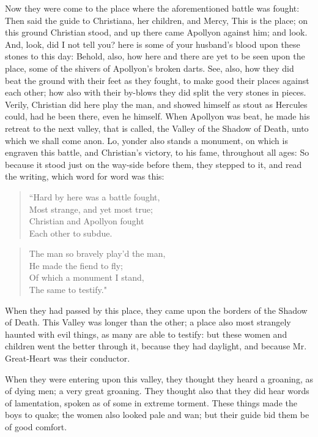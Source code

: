 Now they were come to the place where the aforementioned battle was fought: Then said the guide to Christiana, her children, and Mercy, This is the place; on this ground Christian stood, and up there came Apollyon against him; and look. And, look, did I not tell you? here is some of your husband's blood upon these stones to this day: Behold, also, how here and there are yet to be seen upon the place, some of the shivers of Apollyon's broken darts. See, also, how they did beat the ground with their feet as they fought, to make good their places against each other; how also with their by-blows they did split the very stones in pieces. Verily, Christian did here play the man, and showed himself as stout as Hercules could, had he been there, even he himself. When Apollyon was beat, he made his retreat to the next valley, that is called, the Valley of the Shadow of Death, unto which we shall come anon. Lo, yonder also stands a monument, on which is engraven this battle, and Christian's victory, to his fame, throughout all ages: So because it stood just on the way-side before them, they stepped to it, and read the writing, which word for word was this:
\begin{verse}
``Hard by here was a battle fought,\\
Most strange, and yet most true;\\
Christian and Apollyon fought\\
Each other to subdue.\\
\end{verse}
\begin{verse}
 The man so bravely play'd the man,\\
He made the fiend to fly;\\
Of which a monument I stand,\\
The same to testify."\\
\end{verse}

When they had passed by this place, they came upon the borders of the Shadow of Death. This Valley was longer than the other; a place also most strangely haunted with evil things, as many are able to testify: but these women and children went the better through it, because they had daylight, and because Mr. Great-Heart was their conductor.

When they were entering upon this valley, they thought they heard a groaning, as of dying men; a very great groaning. They thought also that they did hear words of lamentation, spoken as of some in extreme torment. These things made the boys to quake; the women also looked pale and wan; but their guide bid them be of good comfort.

